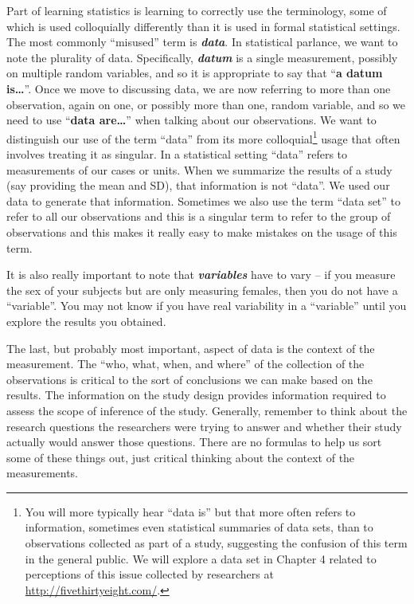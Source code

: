 \documentclass[]{book}
\let\rmarkdownfootnote\footnote%
\def\footnote{\protect\rmarkdownfootnote}
\begin{document}
Part of learning statistics is learning to correctly use the
terminology, some of which is used colloquially differently than it is
used in formal statistical settings. The most commonly ``misused'' term
is \textbf{\emph{data}}. In statistical parlance, we want to note the
plurality of data. Specifically, \textbf{\emph{datum}} is a single
measurement, possibly on multiple random variables, and so it is
appropriate to say that ``\textbf{a datum is\ldots{}}''. Once we move to
discussing data, we are now referring to more than one observation,
again on one, or possibly more than one, random variable, and so we need
to use ``\textbf{data are\ldots{}}'' when talking about our
observations. We want to distinguish our use of the term ``data'' from
its more colloquial\footnote{You will more typically hear ``data is''
  but that more often refers to information, sometimes even statistical
  summaries of data sets, than to observations collected as part of a
  study, suggesting the confusion of this term in the general public. We
  will explore a data set in Chapter 4 related to perceptions of this
  issue collected by researchers at \url{http://fivethirtyeight.com/}.}
usage that often involves treating it as singular. In a statistical
setting ``data'' refers to measurements of our cases or units. When we
summarize the results of a study (say providing the mean and SD), that
information is not ``data''. We used our data to generate that
information. Sometimes we also use the term ``data set'' to refer to all
our observations and this is a singular term to refer to the group of
observations and this makes it really easy to make mistakes on the usage
of this term.

It is also really important to note that \textbf{\emph{variables}} have
to vary -- if you measure the sex of your subjects but are only
measuring females, then you do not have a ``variable''. You may not know
if you have real variability in a ``variable'' until you explore the
results you obtained.

The last, but probably most important, aspect of data is the context of
the measurement. The ``who, what, when, and where'' of the collection of
the observations is critical to the sort of conclusions we can make
based on the results. The information on the study design provides
information required to assess the scope of inference of the study.
Generally, remember to think about the research questions the
researchers were trying to answer and whether their study actually would
answer those questions. There are no formulas to help us sort some of
these things out, just critical thinking about the context of the
measurements.
\end{document}
